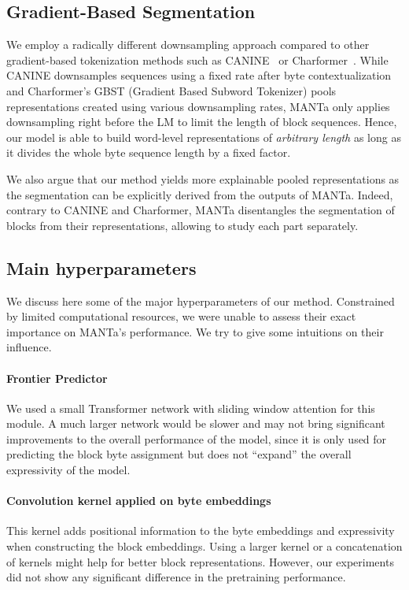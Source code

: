 \subsection{Gradient-Based Segmentation}

We employ a radically different downsampling approach compared to other gradient-based tokenization methods such as CANINE~\cite{clark2022canine} or Charformer~\cite{tay2021charformer}. While CANINE downsamples sequences using a fixed rate after byte contextualization and Charformer's GBST (Gradient Based Subword Tokenizer) pools representations created using various downsampling rates, MANTa only applies downsampling right before the LM to limit the length of block sequences. Hence, our model is able to build word-level representations of \textit{arbitrary length} as long as it divides the whole byte sequence length by a fixed factor.

We also argue that our method yields more explainable pooled representations as the segmentation can be explicitly derived from the outputs of MANTa. Indeed, contrary to CANINE and Charformer, MANTa disentangles the segmentation of blocks from their representations, allowing to study each part separately.

\subsection{Main hyperparameters}
We discuss here some of the major hyperparameters of our method. Constrained by limited computational resources, we were unable to assess their exact importance on MANTa's performance. We try to give some intuitions on their influence.

\paragraph{Frontier Predictor} We used a small Transformer network with sliding window attention for this module. A much larger network would be slower and may not bring significant improvements to the overall performance of the model, since it is only used for predicting the block byte assignment but does not ``expand'' the overall expressivity of the model.

\paragraph{Convolution kernel applied on byte embeddings} This kernel adds positional information to the byte embeddings and expressivity when constructing the block embeddings. Using a larger kernel or a concatenation of kernels might help for better block representations. However, our experiments did not show any significant difference in the pretraining performance.

